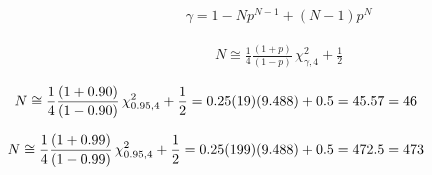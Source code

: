 \documentclass[12pt]{article}
\begin{document}
\pagestyle{empty}
\Large
{}
\pagecolor{ehandbook}

\boldmath
\begin{eqnarray*}
\gamma = 1 - Np^{N-1} + (N-1)p^{N}
\end{eqnarray*}

\vspace*{.25in}

\begin{eqnarray*}
N \cong \frac{1}{4} \frac{(1+p)}{(1-p)} \, \chi^2_{\gamma, 4} +\frac{1}{2}
\end{eqnarray*}

\vspace*{.25in}

\begin{eqnarray*}
\hspace*{-1.25in}
N \cong \frac{1}{4} \frac{(1+0.90)}{(1-0.90)} \, \chi^2_{0.95, 4} +\frac{1}{2} = 0.25(19)(9.488)+0.5 = 45.57 = 46
\end{eqnarray*}

\begin{eqnarray*}
\hspace*{-1.25in}
N \cong \frac{1}{4} \frac{(1+0.99)}{(1-0.99)} \, \chi^2_{0.95, 4} +\frac{1}{2} = 0.25(199)(9.488)+0.5 = 472.5 = 473
\end{eqnarray*}
\end{document}
